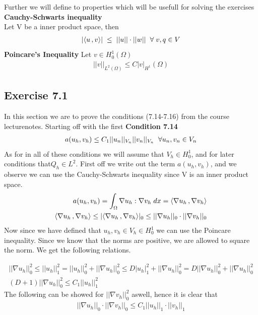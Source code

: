 \documentclass[a4paper,norsk]{article}
\begin{document}
Further we will define to properties which will be usefull for solving the exercises \newline \newline
\textbf{Cauchy-Schwarts inequality} \\
Let V be a inner product space, then
\begin{align*}
 |\langle u \,, v \rangle| \hspace{1mm} \leq \hspace{1mm} ||u|| \cdot ||w|| \hspace{2mm} \forall \hspace{1mm} v,q \in V
\end{align*}
\newline
\textbf{Poincare's Inequality}
Let $v \in H_0^1(\Omega)$
\begin{align*}
||v||_{L^2(\Omega)} \leq C |v|_{H^1} (\Omega)
\end{align*}

\newpage
\subsection*{Exercise 7.1}
In this section we are to prove the conditions (7.14-7.16) from the course lecturenotes.
Starting off with the first
\textbf{Condition 7.14}
\begin{align*}
a(u_h, v_h) \leq C_1 ||u_n||_{V_n} ||v_n||_{V_n} \hspace{2mm} \forall u_n, v_n \in V_n
\end{align*}
As for in all of these conditions we will assume that $V_h \in H_0^1$, and for later conditions that$Q_h \in L^2$.
\newline
First off we write out the term $a(u_h, v_h)$, and we observe we can use the Cauchy-Schwarts inequality since
V is an inner product space.
\begin{align*}
a(u_h, v_h) = \int_\Omega \nabla u_h : \nabla v_h \hspace{1mm} dx  = \langle \nabla u_h \,, \nabla v_h \rangle \\
\langle \nabla u_h \,, \nabla v_h \rangle \leq |\langle \nabla u_h \,, \nabla v_h \rangle|_0
\leq ||\nabla u_h||_0 \cdot ||\nabla v_h||_0
\end{align*}
Now since we have defined that $u_h, v_h \in V_h \in H_0^1$ we can use the Poincare inequality. Since we know that the norms
are positive, we are allowed to square the norm. We get the following relations.

\begin{align*}
||\nabla u_h ||^2_{0} \leq ||u_h||^2_{1} = ||u_h||^2_{0} + ||\nabla u_h||^2_{0} \leq D |u_h|^2_{1} +  ||\nabla u_h||^2_{0} =
D ||\nabla u_h||^2_{0} +  ||\nabla u_h||^2_{0} \\
(D + 1) ||\nabla u_h||^2_{0} \leq C_1 ||u_h||^2_{1}
\end{align*}
The following can be showed for $||\nabla v_h ||^2_{0}$ aswell, hence it is clear that
\begin{align*}
||\nabla u_h ||_0 \cdot ||\nabla v_h ||_0 \leq C_1 ||u_h||_1 \cdot ||v_h||_1
\end{align*}
\end{document}
